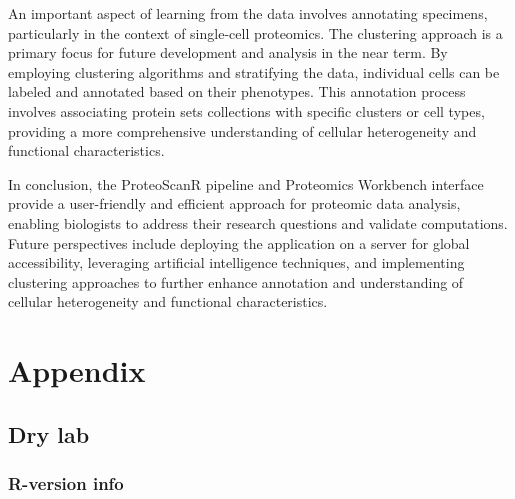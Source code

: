 \documentclass[
  11pt,
]{article}
\begin{document}
An important aspect of learning from the data involves annotating specimens, particularly in the context of single-cell proteomics. The clustering approach is a primary focus for future development and analysis in the near term. By employing clustering algorithms and stratifying the data, individual cells can be labeled and annotated based on their phenotypes. This annotation process involves associating protein sets collections with specific clusters or cell types, providing a more comprehensive understanding of cellular heterogeneity and functional characteristics.

In conclusion, the ProteoScanR pipeline and Proteomics Workbench interface provide a user-friendly and efficient approach for proteomic data analysis, enabling biologists to address their research questions and validate computations. Future perspectives include deploying the application on a server for global accessibility, leveraging artificial intelligence techniques, and implementing clustering approaches to further enhance annotation and understanding of cellular heterogeneity and functional characteristics.

\newpage



\newpage

\hypertarget{appendix}{%
\section{Appendix}\label{appendix}}

\hypertarget{dry-lab}{%
\subsection{Dry lab}\label{dry-lab}}

\hypertarget{r-version-info}{%
\subsubsection{R-version info}\label{r-version-info}}
\end{document}
